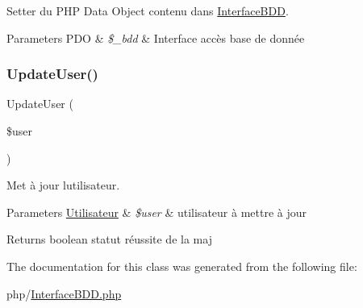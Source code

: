 Setter du P\+HP Data Object contenu dans \mbox{\hyperlink{class_interface_b_d_d}{Interface\+B\+DD}}. 


\begin{DoxyParams}[1]{Parameters}
P\+DO & {\em \$\+\_\+bdd} & Interface accès base de donnée \\
\hline
\end{DoxyParams}
\mbox{\label{class_interface_b_d_d_abf7f8811487ce2a1626969ffbfcf7701}} 
\subsubsection{\texorpdfstring{Update\+User()}{UpdateUser()}}
{\footnotesize\ttfamily Update\+User (\begin{DoxyParamCaption}\item[{}]{\$user }\end{DoxyParamCaption})}



Met à jour l\textquotesingle{}utilisateur. 


\begin{DoxyParams}[1]{Parameters}
\mbox{\hyperlink{class_utilisateur}{Utilisateur}} & {\em \$user} & utilisateur à mettre à jour\\
\hline
\end{DoxyParams}
\begin{DoxyReturn}{Returns}
boolean statut réussite de la maj 
\end{DoxyReturn}


The documentation for this class was generated from the following file\+:\begin{DoxyCompactItemize}
\item 
php/\mbox{\hyperlink{_interface_b_d_d_8php}{Interface\+B\+D\+D.\+php}}\end{DoxyCompactItemize}
